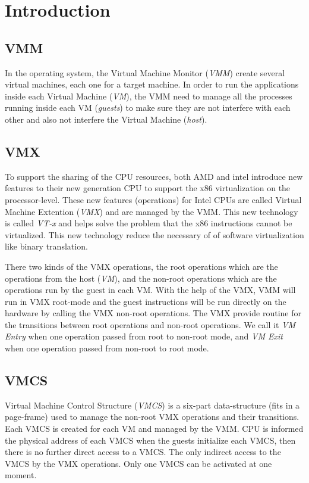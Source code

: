 \documentclass[letterpaper,10pt,onecolumn]{IEEEtran}
\begin{document}
\tableofcontents
\newpage

\section{Introduction}
\subsection{VMM}
In the operating system, the Virtual Machine Monitor (\emph{VMM}) create several virtual machines, each one for a target machine. In order to run the applications inside each Virtual Machine (\emph{VM}), the VMM need to manage all the processes running inside each VM (\emph{guests}) to make sure they are not interfere with each other and also not interfere the Virtual Machine (\emph{host}).

\subsection{VMX}
To support the sharing of the CPU resources, both AMD and intel introduce new features to their new generation CPU to support the x86 virtualization on the processor-level. These new features (operations) for Intel CPUs are called Virtual Machine Extention (\emph{VMX}) and are managed by the VMM. This new technology is called \emph{VT-x} and helps solve the problem that the x86 instructions cannot be virtualized. This new technology reduce the necessary of of software virtualization like binary translation.

There two kinds of the VMX operations, the root operations which are the operations from the host (\emph{VM}), and the non-root operations which are the operations run by the guest in each VM. With the help of the VMX, VMM will run in VMX root-mode and the guest instructions will be run directly on the hardware by calling the VMX non-root operations. The VMX provide routine for the transitions between root operations and non-root operations. We call it \emph{VM Entry} when one operation passed from root to non-root mode, and \emph{VM Exit} when one operation passed from non-root to root mode.

\subsection{VMCS}
Virtual Machine Control Structure (\emph{VMCS}) is a six-part data-structure (fits in a page-frame) used to manage the non-root VMX operations and their transitions. Each VMCS is created for each VM and managed by the VMM.  CPU is informed the physical address of each VMCS when the guests initialize each VMCS, then there is no further direct access to a VMCS. The only indirect access to the VMCS by the VMX operations. Only one VMCS can be activated at one moment.
\end{document}
